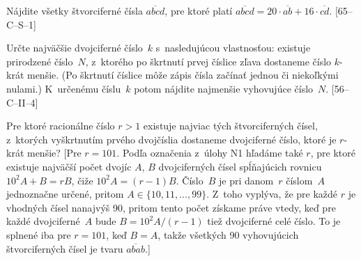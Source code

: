 {\D
Nájdite všetky štvorciferné čísla $\overline{abcd}$, pre ktoré platí
$\overline{abcd}=20\cdot\overline{ab}+16\cdot\overline{cd}$. [65--C--S--1]

Určte najväčšie dvojciferné číslo~$k$ s~nasledujúcou vlastnosťou:
existuje prirodzené číslo~$N$, z~ktorého po škrtnutí prvej číslice
zľava dostaneme číslo $k$-krát menšie. (Po škrtnutí číslice môže
zápis čísla začínať jednou či niekoľkými nulami.) K~určenému
číslu~$k$ potom nájdite najmenšie vyhovujúce číslo~$N$.
[56--C--II--4]

Pre ktoré racionálne číslo $r>1$ existuje najviac
tých štvorciferných čísel, z~ktorých vyškrtnutím prvého dvojčíslia
dostaneme dvojciferné číslo, ktoré je $r$-krát menšie? [Pre
$r=101$. Podľa označenia z~úlohy N1 hľadáme také $r$, pre ktoré
existuje najväčší počet dvojíc $A$, $B$ dvojciferných čísel
spĺňajúcich rovnicu $10^2A+B=rB$, čiže $10^2A=(r-1)B$. Číslo~$B$
je pri danom~$r$ číslom~$A$ jednoznačne určené, pritom
$A\in\{10,11,\dots,99\}$. Z~toho vyplýva, že pre každé $r$ je
vhodných čísel nanajvýš 90, pritom tento počet
získame práve vtedy, keď pre každé dvojciferné~$A$ bude
$B=10^2A/(r-1)$ tiež dvojciferné celé číslo. To je splnené iba pre
$r=101$, keď $B=A$, takže všetkých 90 vyhovujúcich štvorciferných
čísel je tvaru $\overline{abab}$.]
}

